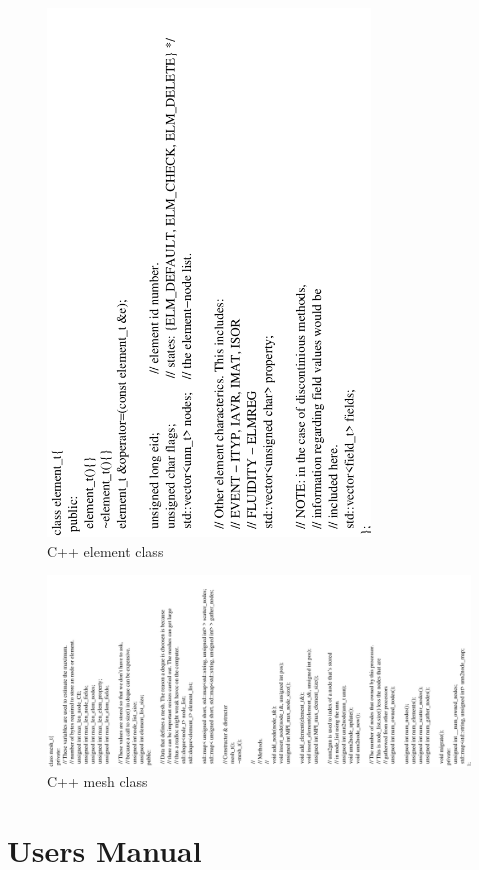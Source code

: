 \documentclass[11pt]{article}
\begin{document}
\begin{figure}[h]\label{fig:element_class}
\centering
\includegraphics[height=140mm, angle=-90]{images/element_class}
\caption{C++ element class}
\end{figure} 

\begin{figure}[h]\label{fig:mesh_class}
\centering
\includegraphics[width=210mm, angle=-90]{images/mesh_class}
\caption{C++ mesh class}
\end{figure} 

\section{Users Manual}
\end{document}
